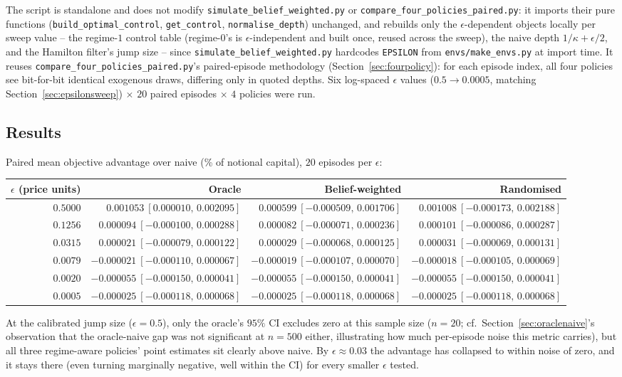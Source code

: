 \documentclass[11pt]{article}
\begin{document}
The script is standalone and does not modify \texttt{simulate\_belief\_weighted.py} or \texttt{compare\_four\_policies\_paired.py}: it imports their pure functions (\texttt{build\_optimal\_control}, \texttt{get\_control}, \texttt{normalise\_depth}) unchanged, and rebuilds only the $\epsilon$-dependent objects locally per sweep value -- the regime-$1$ control table (regime-$0$'s is $\epsilon$-independent and built once, reused across the sweep), the naive depth $1/\kappa+\epsilon/2$, and the Hamilton filter's jump size -- since \texttt{simulate\_belief\_weighted.py} hardcodes \texttt{EPSILON} from \texttt{envs/make\_envs.py} at import time. It reuses \texttt{compare\_four\_policies\_paired.py}'s paired-episode methodology (Section~\ref{sec:fourpolicy}): for each episode index, all four policies see bit-for-bit identical exogenous draws, differing only in quoted depths. Six log-spaced $\epsilon$ values ($0.5\to0.0005$, matching Section~\ref{sec:epsilonsweep}) $\times$ $20$ paired episodes $\times$ $4$ policies were run.

\subsection{Results}
Paired mean objective advantage over naive (\% of notional capital), $20$ episodes per $\epsilon$:
\begin{center}
\begin{tabular}{@{}rrrr@{}}
\toprule
$\epsilon$ (price units) & Oracle & Belief-weighted & Randomised \\
\midrule
$0.5000$ & $0.001053\ [0.000010,\,0.002095]$ & $0.000599\ [-0.000509,\,0.001706]$ & $0.001008\ [-0.000173,\,0.002188]$ \\
$0.1256$ & $0.000094\ [-0.000100,\,0.000288]$ & $0.000082\ [-0.000071,\,0.000236]$ & $0.000101\ [-0.000086,\,0.000287]$ \\
$0.0315$ & $0.000021\ [-0.000079,\,0.000122]$ & $0.000029\ [-0.000068,\,0.000125]$ & $0.000031\ [-0.000069,\,0.000131]$ \\
$0.0079$ & $-0.000021\ [-0.000110,\,0.000067]$ & $-0.000019\ [-0.000107,\,0.000070]$ & $-0.000018\ [-0.000105,\,0.000069]$ \\
$0.0020$ & $-0.000055\ [-0.000150,\,0.000041]$ & $-0.000055\ [-0.000150,\,0.000041]$ & $-0.000055\ [-0.000150,\,0.000041]$ \\
$0.0005$ & $-0.000025\ [-0.000118,\,0.000068]$ & $-0.000025\ [-0.000118,\,0.000068]$ & $-0.000025\ [-0.000118,\,0.000068]$ \\
\bottomrule
\end{tabular}
\end{center}
At the calibrated jump size ($\epsilon=0.5$), only the oracle's $95\%$ CI excludes zero at this sample size ($n=20$; cf.\ Section~\ref{sec:oraclenaive}'s observation that the oracle-naive gap was not significant at $n=500$ either, illustrating how much per-episode noise this metric carries), but all three regime-aware policies' point estimates sit clearly above naive. By $\epsilon\approx0.03$ the advantage has collapsed to within noise of zero, and it stays there (even turning marginally negative, well within the CI) for every smaller $\epsilon$ tested.
\end{document}
